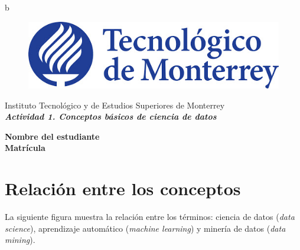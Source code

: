 b\documentclass[12pt]{article}
\begin{document}
\thispagestyle{empty}
\begin{center}
\begin{figure}[h]
\centering
\includegraphics[width=.6\textwidth]{logo.jpg}\\
\end{figure}

\vspace{1cm}
\Large \sc  Instituto Tecnológico y de Estudios Superiores de Monterrey
\\

\vspace{2.5cm}
\Large \bf
\emph{Actividad 1. Conceptos básicos de ciencia de datos}

\vspace{2.5cm}
\Large \bf Nombre del estudiante\\
\vspace{0.3cm}
\Large \bf Matrícula\\
\vspace{3.5cm}
\normalsize \sc {}
\vspace{0.3cm}
\normalsize \sc {}
\end{center}

\newpage

\section{Relación entre los conceptos}
La siguiente figura muestra la relación entre los términos: ciencia de datos (\emph{data science}), aprendizaje automático (\emph{machine learning}) y minería de datos (\emph{data mining}). \\
\end{document}

